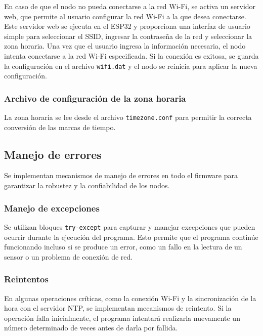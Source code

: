 En caso de que el nodo no pueda conectarse a la red Wi-Fi, se activa un
servidor web, que permite al usuario configurar la red Wi-Fi a la que desea
conectarse. Este servidor web se ejecuta en el ESP32 y proporciona una interfaz
de usuario simple para seleccionar el SSID, ingresar la contraseña de la red y
seleccionar la zona horaria. Una vez que el usuario ingresa la información
necesaria, el nodo intenta conectarse a la red Wi-Fi especificada. Si la
conexión es exitosa, se guarda la configuración en el archivo \texttt{wifi.dat}
y el nodo se reinicia para aplicar la nueva configuración.

\subsubsection{Archivo de configuración de la zona horaria}

La zona horaria se lee desde el archivo \texttt{timezone.conf} para permitir la
correcta conversión de las marcas de tiempo.


\subsection{Manejo de errores}

Se implementan mecanismos de manejo de errores en todo el firmware para
garantizar la robustez y la confiabilidad de los nodos.

\subsubsection{Manejo de excepciones}

Se utilizan bloques \texttt{try-except} para capturar y manejar excepciones que
pueden ocurrir durante la ejecución del programa. Esto permite que el programa
continúe funcionando incluso si se produce un error, como un fallo en la
lectura de un sensor o un problema de conexión de red.

\subsubsection{Reintentos}

En algunas operaciones críticas, como la conexión Wi-Fi y la sincronización de
la hora con el servidor NTP, se implementan mecanismos de reintento. Si la
operación falla inicialmente, el programa intentará realizarla nuevamente un
número determinado de veces antes de darla por fallida.

